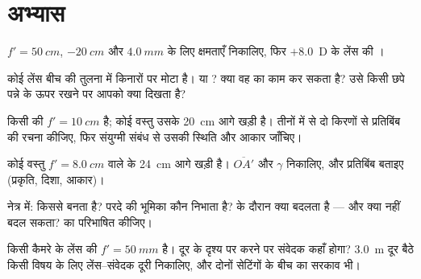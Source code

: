 \section{अभ्यास}

\begin{exercise}[$\star$]\label{exo:g11:lenses-and-eye:1}
$f' = \qty{50}{cm}$, $\qty{-20}{cm}$ और $\qty{4.0}{mm}$ के लिए क्षमताएँ निकालिए, फिर
$+8.0$~D के लेंस की ।
\end{exercise}

\begin{exercise}[$\star$]\label{exo:g11:lenses-and-eye:2}
कोई लेंस बीच की तुलना में किनारों पर मोटा है। 
या ? क्या वह  का काम कर सकता है? उसे किसी
छपे पन्ने के ऊपर रखने पर आपको क्या दिखता है?
\end{exercise}

\begin{exercise}[$\star$]\label{exo:g11:lenses-and-eye:3}
किसी  की $f' = \qty{10}{cm}$ है; कोई वस्तु उसके \qty{20}{cm} आगे
खड़ी है। तीनों में से दो किरणों से प्रतिबिंब की रचना कीजिए, फिर संयुग्मी
संबंध से उसकी स्थिति और आकार जाँचिए।
\end{exercise}

\begin{exercise}[$\star$]\label{exo:g11:lenses-and-eye:4}
कोई वस्तु $f' = \qty{8.0}{cm}$ वाले  के \qty{24}{cm} आगे खड़ी है।
$\overline{OA'}$ और $\gamma$ निकालिए, और प्रतिबिंब बताइए (प्रकृति, दिशा, आकार)।
\end{exercise}

\begin{exercise}[$\star$]\label{exo:g11:lenses-and-eye:5}
नेत्र में:  किससे बनता है? परदे की भूमिका कौन
निभाता है?  के दौरान क्या बदलता है --- और क्या नहीं बदल
सकता?  का  परिभाषित कीजिए।
\end{exercise}

\begin{exercise}[$\star\star$]\label{exo:g11:lenses-and-eye:6}
किसी कैमरे के लेंस की $f' = \qty{50}{mm}$ है। दूर के दृश्य पर  करने पर
संवेदक कहाँ होगा? \qty{3.0}{m} दूर बैठे किसी विषय के लिए लेंस--संवेदक दूरी
निकालिए, और दोनों सेटिंगों के बीच का सरकाव भी।
\end{exercise}

